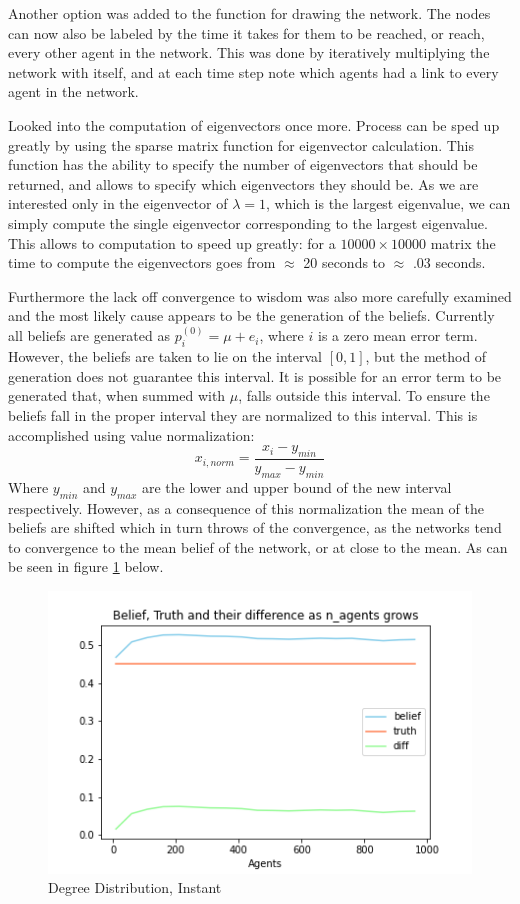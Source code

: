 \documentclass{article}
\begin{document}
Another option was added to the function for drawing the network. The nodes can now also be labeled by the time it takes for them to be reached, or reach, every other agent in the network. This was done by iteratively multiplying the network with itself, and at each time step note which agents had a link to every agent in the network.

Looked into the computation of eigenvectors once more. Process can be sped up greatly by using the sparse matrix function for eigenvector calculation. This function has the ability to specify the number of eigenvectors that should be returned, and allows to specify which eigenvectors they should be. As we are interested only in the eigenvector of $\lambda=1$, which is the largest eigenvalue, we can simply compute the single eigenvector corresponding to the largest eigenvalue. This allows to computation to speed up greatly: for a $10000\times 10000$ matrix the time to compute the eigenvectors goes from $\approx$ 20 seconds to $\approx$ .03 seconds.

Furthermore the lack off convergence to wisdom was also more carefully examined and the most likely cause appears to be the generation of the beliefs. Currently all beliefs are generated as $p_i^{(0)} = \mu + e_i$, where $i$ is a zero mean error term. However, the beliefs are taken to lie on the interval $[0, 1]$, but the method of generation does not guarantee this interval. It is possible for an error term to be generated that, when summed with $\mu$, falls outside this interval. To ensure the beliefs fall in the proper interval they are normalized to this interval. This is accomplished using value normalization:
\begin{equation}
    x_{i, norm} = \frac{x_i - y_{min}}{y_{max} - y_{min}}
\end{equation}
Where $ y_{min}$ and $y_{max}$ are the lower and upper bound of the new interval respectively.
However, as a consequence of this normalization the mean of the beliefs are shifted which in turn throws of the convergence, as the networks tend to convergence to the mean belief of the network, or at close to the mean. As can be seen in figure \ref{wisdom:nonorm} below.
\newpage
\begin{center}
    \begin{figure}[!htbp]
        \centering
        \includegraphics[width=.7\textwidth]{ThesisKI/Images/WithoutNormalizedTruth.png}
        \caption{Degree Distribution, Instant}
        \label{wisdom:nonorm}
    \end{figure}
\end{center}
\end{document}
